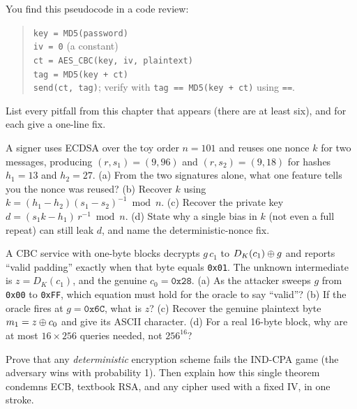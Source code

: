 \begin{exercise}
\label{ch38:ex-audit}
You find this pseudocode in a code review:
\begin{quote}
\texttt{key = MD5(password)} \\
\texttt{iv = 0} \quad (a constant) \\
\texttt{ct = AES\_CBC(key, iv, plaintext)} \\
\texttt{tag = MD5(key + ct)} \\
\texttt{send(ct, tag)}; \quad verify with \texttt{tag == MD5(key + ct)} using \texttt{==}.
\end{quote}
List every pitfall from this chapter that appears (there are at least six), and for each give a one-line fix.
\end{exercise}

\begin{exercise}
\label{ch38:ex-ecdsa-ex}
A signer uses ECDSA over the toy order $n = 101$ and reuses one nonce $k$ for two messages, producing $(r, s_1) = (9, 96)$ and $(r, s_2) = (9, 18)$ for hashes $h_1 = 13$ and $h_2 = 27$. (a) From the two signatures alone, what one feature tells you the nonce was reused? (b) Recover $k$ using $k = (h_1 - h_2)(s_1 - s_2)^{-1} \bmod n$. (c) Recover the private key $d = (s_1 k - h_1)\,r^{-1} \bmod n$. (d) State why a single bias in $k$ (not even a full repeat) can still leak $d$, and name the deterministic-nonce fix.
\end{exercise}

\begin{exercise}
\label{ch38:ex-padding-num-ex}
A CBC service with one-byte blocks decrypts $g\,c_1$ to $D_K(c_1)\oplus g$ and reports ``valid padding'' exactly when that byte equals \texttt{0x01}. The unknown intermediate is $z = D_K(c_1)$, and the genuine $c_0 = \texttt{0x28}$. (a) As the attacker sweeps $g$ from \texttt{0x00} to \texttt{0xFF}, which equation must hold for the oracle to say ``valid''? (b) If the oracle fires at $g = \texttt{0x6C}$, what is $z$? (c) Recover the genuine plaintext byte $m_1 = z \oplus c_0$ and give its ASCII character. (d) For a real 16-byte block, why are at most $16\times 256$ queries needed, not $256^{16}$?
\end{exercise}

\begin{exercise}
\label{ch38:ex-det}
Prove that any \emph{deterministic} encryption scheme fails the IND-CPA game (the adversary wins with probability 1). Then explain how this single theorem condemns ECB, textbook RSA, and any cipher used with a fixed IV, in one stroke.
\end{exercise}
